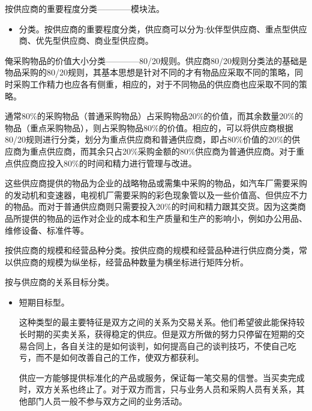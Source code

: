     \begin{enumerate.zh}
    \item 按供应商的重要程度分类————模块法。

        \begin{itemize}
            \item  分类。按供应商的重要程度分类，供应商可以分为:伙伴型供应商、重点型供应商、优先型供应商、商业型供应商。
        \end{itemize}

    \item 俺采购物品的价值大小分类————80/20规则。供应商80/20规则分类法的基础是物品采购的80/20规则，其基本思想是针对不同的才有物品应采取不同的策略，同时采购工作精力也应各有侧重，相应的，对于不同物品的供应商也应采取不同的策略。

    通常80\%的采购物品（普通采购物品）占采购物品20\%的价值，而其余数量20\%的物品（重点采购物品），则占采购物品80\%的价值。相应的，可以将供应商根据80/20规则进行分类，划分为重点供应商和普通供应商，即占80\%价值的20\%的供应商为重点供应商，而其余只占20\%采购金额的80\%供应商为普通供应商。对于重点供应商应投入80\%的时间和精力进行管理与改进。

    这些供应商提供的物品为企业的战略物品或需集中采购的物品，如汽车厂需要采购的发动机和变速器，电视机厂需要采购的彩色现象管以及一些价值高、但供应不力的物品。而对于普通供应商则只需要投入20\%的时间和精力跟其交货。因为这类商品所提供的物品的运作对企业的成本和生产质量和生产的影响小，例如办公用品、维修设备、标准件等。

    \item 按供应商的规模和经营品种分类。按供应商的规模和经营品种进行供应商分类，常以供应商的规模为纵坐标，经营品种数量为横坐标进行矩阵分析。

    \item 按与供应商的关系目标分类。

        \begin{itemize}
            \item  短期目标型。

            这种类型的最主要特征是双方之间的关系为交易关系。他们希望彼此能保持较长时期的买卖关系，获得稳定的供应。但是双方所做的努力只停留在短期的交易合同上，各自关注的是如何谈判，如何提高自己的谈判技巧，不使自己吃亏，而不是如何改善自己的工作，使双方都获利。

            供应一方能够提供标准化的产品或服务，保证每一笔交易的信誉。当买卖完成时，双方关系也终止了。对于双方而言，只与业务人员和采购人员有关系，其他部门人员一般不参与双方之间的业务活动。


\end{itemize}
\end{enumerate.zh}
